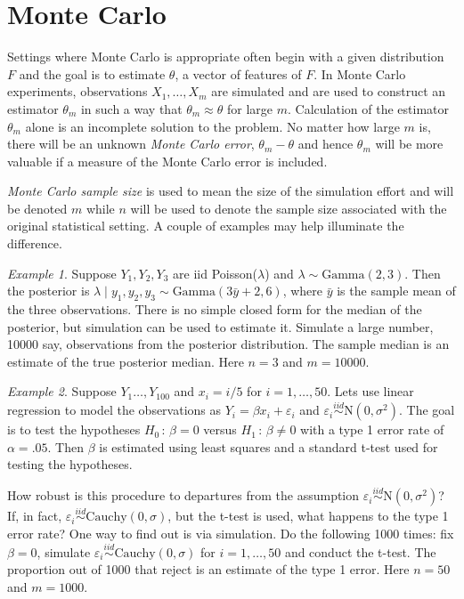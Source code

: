 \documentclass[12pt]{article}
\theoremstyle{plain}
\theoremstyle{definition}
\theoremstyle{remark}
\newtheorem{example}{Example}[section]
\begin{document}
\section{Monte Carlo}
\label{gofmc:sec:Monte Carlo}

Settings where Monte Carlo is appropriate often begin with a given
distribution $F$ and the goal is to estimate $\theta$, a vector of
features of $F$.  In Monte Carlo experiments, observations
$X_{1}, \ldots, X_{m}$ are simulated and are used to construct an
estimator $\theta_m$ in such a way that $\theta_m \approx \theta$ for
large $m$.  Calculation of the estimator $\theta_m$ alone is an
incomplete solution to the problem. No matter how large $m$ is, there
will be an unknown \textit{Monte Carlo error}, $\theta_m - \theta$ and
hence $\theta_m$ will be more valuable if a measure of the
Monte Carlo error is included. 

\textit{Monte Carlo sample size} is used to mean the size of the
simulation effort and  will be denoted $m$ while $n$ will be used to
denote the sample size associated with the original statistical
setting.  A couple of examples may help illuminate the difference.

\begin{example}
  Suppose $Y_1,Y_2, Y_3$ are iid Poisson($\lambda$) and $\lambda \sim
  \text{Gamma}(2,3)$.  Then the posterior is $\lambda \mid y_1, y_2, y_3
  \sim \text{Gamma}(3\bar{y} + 2, 6)$, where $\bar{y}$ is the sample
  mean of the three observations.  There is no simple closed form for
  the median of the posterior, but simulation can be used to estimate
  it.  Simulate a large number, 10000 say, observations from the
  posterior distribution.  The sample median is an estimate of the
  true posterior median.  Here $n=3$ and $m=10000$.
\end{example}

\begin{example}
  Suppose $Y_1 \ldots, Y_{100}$ and $x_i = i/5$ for $i=1,
  \ldots, 50$. Lets use linear regression to model the observations
  as $Y_i=\beta x_i + \varepsilon_i$ and $\varepsilon_i
  \stackrel{iid}{\sim}\text{N}(0, \sigma^2)$.  The goal is to test the
  hypotheses $H_0 \, : \, \beta=0$ versus $H_1 \, : \, \beta \neq 0$
  with a type 1 error rate of $\alpha=.05$.  Then $\beta$ is estimated
  using least squares and a standard t-test used for testing the
  hypotheses.

  How robust is this procedure to departures from the assumption
  $\varepsilon_i \stackrel{iid}{\sim}\text{N}(0, \sigma^2)$?  If, in
  fact, $\varepsilon_i \stackrel{iid}{\sim} \text{Cauchy}(0, \sigma)$,
  but the t-test is used, what happens to the type 1 error
  rate?  One way to find out is via simulation.  Do the following 1000
  times: fix $\beta=0$, simulate $\varepsilon_i \stackrel{iid}{\sim}
  \text{Cauchy}(0, \sigma)$ for $i=1, \ldots, 50$ and conduct the
  t-test.  The proportion out of 1000 that reject is an estimate of
  the type 1 error.  Here $n=50$ and $m = 1000$.
\end{example}
\end{document}
